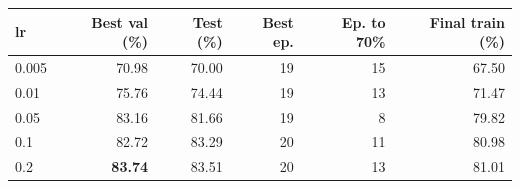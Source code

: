 \begin{tabular}{lrrrrr}
\toprule
lr & Best val (\%) & Test (\%) & Best ep. & Ep. to 70\% & Final train (\%) \\
\midrule
0.005 & 70.98 & 70.00 & 19 & 15 & 67.50 \\
0.01 & 75.76 & 74.44 & 19 & 13 & 71.47 \\
0.05 & 83.16 & 81.66 & 19 & 8 & 79.82 \\
0.1 & 82.72 & 83.29 & 20 & 11 & 80.98 \\
0.2 & \textbf{83.74} & 83.51 & 20 & 13 & 81.01 \\
\bottomrule
\end{tabular}
